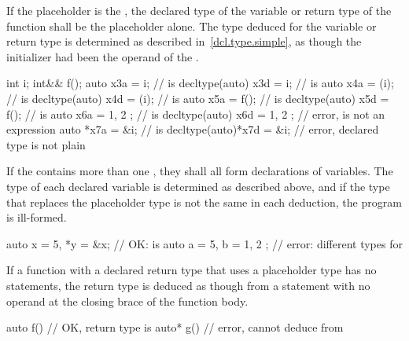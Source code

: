 If the placeholder is the  ,
the declared type of the variable or return type of the function shall be the
placeholder alone. The type deduced for the variable or return type is
determined as described in~\ref{dcl.type.simple}, as though the initializer had
been the operand of the . \enterexample
\begin{codeblock}
int i;
int&& f();
auto           x3a = i;        //  is 
decltype(auto) x3d = i;        //  is 
auto           x4a = (i);      //  is 
decltype(auto) x4d = (i);      //  is 
auto           x5a = f();      //  is 
decltype(auto) x5d = f();      //  is 
auto           x6a = { 1, 2 }; //  is 
decltype(auto) x6d = { 1, 2 }; // error,  is not an expression
auto          *x7a = &i;       //  is 
decltype(auto)*x7d = &i;       // error, declared type is not plain 
\end{codeblock}
\exitexample

\pnum
If the  contains more than one
, they shall all form declarations of
variables. The type of each declared variable is determined as
described above, and if the type that replaces the placeholder type is not the
same in each deduction, the program is ill-formed.

\enterexample
\begin{codeblock}
auto x = 5, *y = &x;        // OK:  is 
auto a = 5, b = { 1, 2 };   // error: different types for 
\end{codeblock}
\exitexample%

\pnum
If a function with a declared return type that uses a placeholder type has no
 statements, the return type is deduced as though from a
 statement with no operand at the closing brace of the function
body.
\enterexample
\begin{codeblock}
auto  f() { } // OK, return type is 
auto* g() { } // error, cannot deduce  from 
\end{codeblock}
\exitexample

